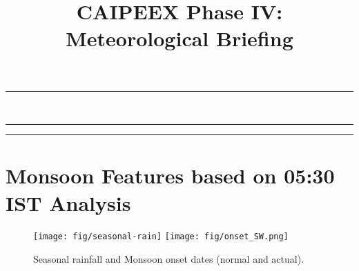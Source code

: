 \documentclass[12pt,a4paper]{article} %
\title{CAIPEEX Phase IV: Meteorological Briefing}%
\newcommand{\HorRule}[1]{\noindent\rule{\linewidth}{#1}} %
\newcommand{\SepRule}{\noindent	%
\begin{center}
\rule{250pt}{1pt} %
\end{center}
}
\begin{document}
\maketitle

\noindent\HorRule{3pt} \\[-0.75\baselineskip] %
\HorRule{1pt} %




%


\begin{multicols}{3} %
\tableofcontents
\SepRule %
\vspace{0.3cm}




\vfill
\section{Monsoon Features based on 05:30 IST Analysis}

\begin{itemize}

\end{itemize}

\end{multicols}

\begin{figure}[H]
\centering
\texttt{[image: fig/seasonal-rain]}
\texttt{[image: fig/onset\_SW.png]}
\caption{Seasonal rainfall and Monsoon onset dates (normal and actual).}
\end{figure}
\end{document}
